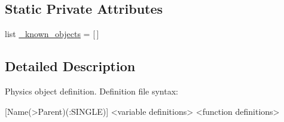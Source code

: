 \subsection*{Static Private Attributes}
\begin{DoxyCompactItemize}
\item 
list \hyperlink{classpanda_1_1physics_1_1PhysicsObject_a7fb3aa249cdd7d2cdec9ab7b4626e9b1}{\_\-known\_\-objects} = \mbox{[}$\,$\mbox{]}
\end{DoxyCompactItemize}


\subsection{Detailed Description}
\begin{DoxyVerb}
Physics object definition. Definition file syntax:

[Name(>Parent)(:SINGLE)]
<variable definitions>
<function definitions>
\end{DoxyVerb}
 

